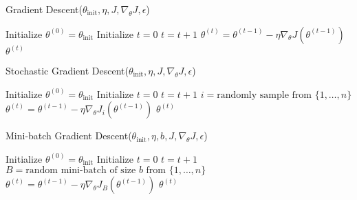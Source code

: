 \documentclass{article}
\begin{document}
\begin{algorithm*}
\caption{Gradient Descent($\theta_{\text{init}}, \eta, J, \nabla_\theta J, \epsilon$)}
\label{alg:gradient-descent}
\begin{algorithmic}[1]
\STATE Initialize $\theta^{(0)} = \theta_{\text{init}}$
\STATE Initialize $t = 0$
\REPEAT
  \STATE $t = t + 1$
  \STATE $\theta^{(t)} = \theta^{(t-1)} - \eta \nabla_\theta J(\theta^{(t-1)})$
\RETURN $\theta^{(t)}$
\end{algorithmic}
\end{algorithm*}

\begin{algorithm*}
\caption{Stochastic Gradient Descent($\theta_{\text{init}}, \eta, J, \nabla_\theta J, \epsilon$)}
\label{alg:stochastic-gradient-descent}
\begin{algorithmic}[1]
\STATE Initialize $\theta^{(0)} = \theta_{\text{init}}$
\STATE Initialize $t = 0$
\REPEAT
  \STATE $t = t + 1$
  \STATE $i = \text{randomly sample from } \{1, \ldots, n\}$
  \STATE $\theta^{(t)} = \theta^{(t-1)} - \eta \nabla_\theta J_i(\theta^{(t-1)})$
\RETURN $\theta^{(t)}$
\end{algorithmic}
\end{algorithm*}

\begin{algorithm*}
\caption{Mini-batch Gradient Descent($\theta_{\text{init}}, \eta, b, J, \nabla_\theta J, \epsilon$)}
\label{alg:mini-batch-gradient-descent}
\begin{algorithmic}[1]
\STATE Initialize $\theta^{(0)} = \theta_{\text{init}}$
\STATE Initialize $t = 0$
\REPEAT
  \STATE $t = t + 1$
  \STATE $B = \text{random mini-batch of size } b \text{ from } \{1, \ldots, n\}$
  \STATE $\theta^{(t)} = \theta^{(t-1)} - \eta \nabla_\theta J_B(\theta^{(t-1)})$
\RETURN $\theta^{(t)}$
\end{algorithmic}
\end{algorithm*}
\end{document}
